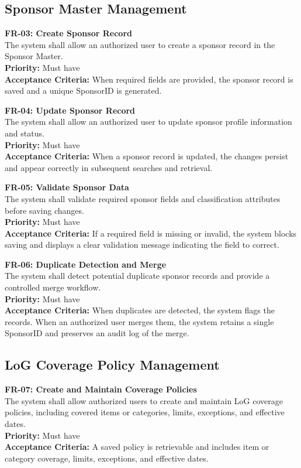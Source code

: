 \documentclass[12pt,a4paper]{article}
\begin{document}
\subsection{Sponsor Master Management}

\textbf{FR-03: Create Sponsor Record}\\
The system shall allow an authorized user to create a sponsor record in the Sponsor Master.\\
\textbf{Priority:} Must have\\
\textbf{Acceptance Criteria:} When required fields are provided, the sponsor record is saved and a unique SponsorID is generated.

\textbf{FR-04: Update Sponsor Record}\\
The system shall allow an authorized user to update sponsor profile information and status.\\
\textbf{Priority:} Must have\\
\textbf{Acceptance Criteria:} When a sponsor record is updated, the changes persist and appear correctly in subsequent searches and retrieval.

\textbf{FR-05: Validate Sponsor Data}\\
The system shall validate required sponsor fields and classification attributes before saving changes.\\
\textbf{Priority:} Must have\\
\textbf{Acceptance Criteria:} If a required field is missing or invalid, the system blocks saving and displays a clear validation message indicating the field to correct.

\textbf{FR-06: Duplicate Detection and Merge}\\
The system shall detect potential duplicate sponsor records and provide a controlled merge workflow.\\
\textbf{Priority:} Must have\\
\textbf{Acceptance Criteria:} When duplicates are detected, the system flags the records. When an authorized user merges them, the system retains a single SponsorID and preserves an audit log of the merge.

\subsection{LoG Coverage Policy Management}

\textbf{FR-07: Create and Maintain Coverage Policies}\\
The system shall allow authorized users to create and maintain LoG coverage policies, including covered items or categories, limits, exceptions, and effective dates.\\
\textbf{Priority:} Must have\\
\textbf{Acceptance Criteria:} A saved policy is retrievable and includes item or category coverage, limits, exceptions, and effective dates.
\end{document}
